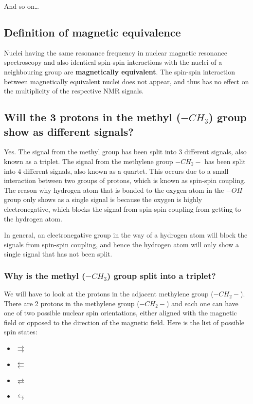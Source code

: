 \documentclass[11pt]{article}
\begin{document}
And so on\ldots{}

\subsection{Definition of magnetic equivalence}
\label{sec:orgd59d887}
Nuclei having the same resonance frequency in nuclear magnetic resonance spectroscopy and also identical spin-spin interactions with the nuclei of a neighbouring group are \textbf{magnetically equivalent}. The spin-spin interaction between magnetically equivalent nuclei does not appear, and thus has no effect on the multiplicity of the respective NMR signals.

\newpage

\subsection{Will the 3 protons in the methyl (\(-CH_3\)) group show as different signals?}
\label{sec:orgcbab92a}
Yes. The signal from the methyl group has been split into 3 different signals, also known as a triplet. The signal from the methylene group \(-CH_2-\) has been split into 4 different signals, also known as a quartet. This occurs due to a small interaction between two groups of protons, which is known as spin-spin coupling.
\\[0pt]

The reason why hydrogen atom that is bonded to the oxygen atom in the \(-OH\) group only shows as a single signal is because the oxygen is highly electronegative, which blocks the signal from spin-spin coupling from getting to the hydrogen atom.

In general, an electronegative group in the way of a hydrogen atom will block the signals from spin-spin coupling, and hence the hydrogen atom will only show a single signal that has not been split.

\subsubsection{Why is the methyl (\(-CH_3\)) group split into a triplet?}
\label{sec:orgb882a3f}
We will have to look at the protons in the adjacent methylene group (\(-CH_2-\)). There are 2 protons in the methylene group (\(-CH_2-\)) and each one can have one of two possible nuclear spin orientations, either aligned with the magnetic field or opposed to the direction of the magnetic field. Here is the list of possible spin states:
\begin{itemize}
\item \(\rightrightarrows\)
\item \(\leftleftarrows\)
\item \(\rightleftarrows\)
\item \(\leftrightarrows\)
\end{itemize}
\end{document}
